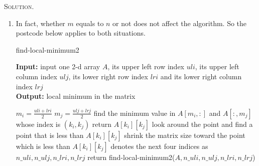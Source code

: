 \documentclass[12pt, a4paper, oneside]{ctexart}
\newenvironment{solution}{\par\noindent\textsc{Solution. }}{\\\par}
\begin{document}
\begin{solution}
\begin{enumerate}
        \item In fact, whether $m$ equals to $n$ or not does not affect the algorithm. So the postcode below applies to both situations. 
        \begin{algorithm}[H]
            \caption{find-local-minimum2} %
            \label{alg:find-local-minimum2}
            \hspace*{0.02in} {\bf Input:} %
            input one 2-d array $A$, its upper left row index $uli$, its upper left column index $ulj$, its lower right row index $lri$ and its lower right column index $lrj$ \\
            \hspace*{0.02in} {\bf Output:} %
            local minimum in the matrix
            \begin{algorithmic}[1]
                
                \State $m_i=\frac{uli + lri}{2}$
                \State $m_j=\frac{ulj + lrj}{2}$
                \State find the minimum value in $A[m_i, :]$ and $A[:, m_j]$ whose index is $(k_i, k_j)$
                    \State return $A[k_i][k_j]$
                \Else
                    \State look around the point and find a point that is less than $A[k_i][k_j]$
                    \State shrink the matrix size toward the point which is less than $A[k_i][k_j]$
                    \State denotes the next four indices as $n\_uli,n\_ulj, n\_lri, n\_lrj$
                    \State return find-local-minimum2($A, n\_uli,n\_ulj, n\_lri, n\_lrj$)


\end{algorithmic}
\end{algorithm}
\end{enumerate}
\end{solution}
\end{document}
